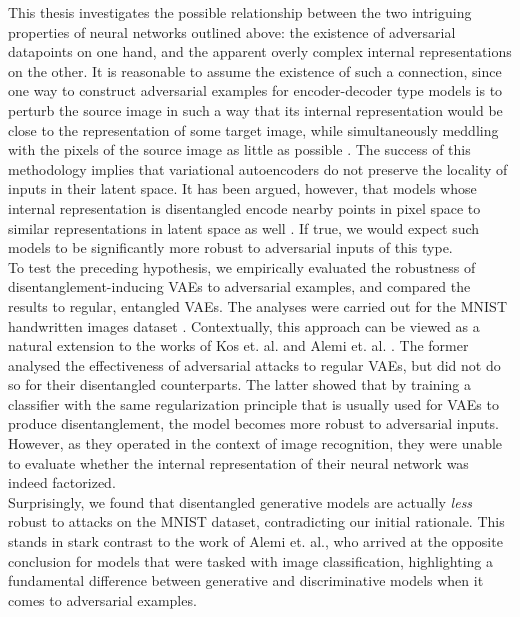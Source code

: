 \documentclass{report}
\begin{document}
\noindent This thesis investigates the possible relationship between the two intriguing properties of neural networks outlined above: the existence of adversarial datapoints on one hand, and the apparent overly complex internal representations on the other. It is reasonable to assume the existence of such a connection, since one way to construct adversarial examples for encoder-decoder type models is to perturb the source image in such a way that its internal representation would be close to the representation of some target image, while simultaneously meddling with the pixels of the source image as little as possible \cite{kos-gen-adv, tabacof-gen-adv}. The success of this methodology implies that variational autoencoders do not preserve the locality of inputs in their latent space. It has been argued, however, that models whose internal representation is disentangled encode nearby points in pixel space to similar representations in latent space as well \cite{beta-vae}. If true, we would expect such models to be significantly more robust to adversarial inputs of this type. \\

\noindent To test the preceding hypothesis, we empirically evaluated the robustness of disentanglement-inducing VAEs to adversarial examples, and compared the results to regular, entangled VAEs. The analyses were carried out for the MNIST handwritten images dataset \cite{mnist}. Contextually, this approach can be viewed as a natural extension to the works of Kos et. al. \cite{kos-gen-adv} and Alemi et. al. \cite{deep-variational-bottleneck}. The former analysed the effectiveness of adversarial attacks to regular VAEs, but did not do so for their disentangled counterparts. The latter showed that by training a classifier with the same regularization principle that is usually used for VAEs to produce disentanglement, the model becomes more robust to adversarial inputs. However, as they operated in the context of image recognition, they were unable to evaluate whether the internal representation of their neural network was indeed factorized. \\

\noindent Surprisingly, we found that disentangled generative models are actually \textit{less} robust to attacks on the MNIST dataset, contradicting our initial rationale. This stands in stark contrast to the work of Alemi et. al., who arrived at the opposite conclusion for models that were tasked with image classification, highlighting a fundamental difference between generative and discriminative models when it comes to adversarial examples. \\
\end{document}
